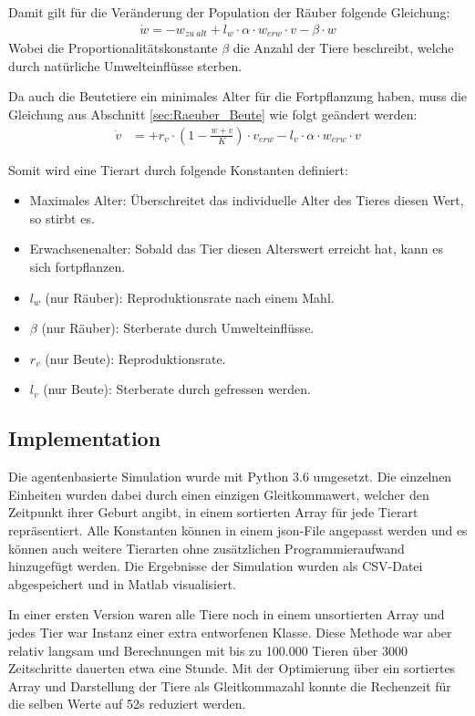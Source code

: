 \documentclass[a4paper,twoside]{article}
\begin{document}
	Damit gilt für die Veränderung der Population der Räuber folgende Gleichung:
	\begin{align*}
		\dot{w} = -w_{zu~alt} + l_w \cdot \alpha \cdot w_{erw} \cdot v - \beta \cdot w
	\end{align*}
	Wobei die Proportionalitätskonstante \(\beta\) die Anzahl der Tiere beschreibt, welche durch natürliche Umwelteinflüsse sterben.

	Da auch die Beutetiere ein minimales Alter für die Fortpflanzung haben, muss die Gleichung aus Abschnitt \ref{sec:Raeuber_Beute} wie folgt geändert werden:
	\begin{align*}
		\dot{v} &= +r_v \cdot \left(1 - \frac{w+v}{K} \right) \cdot v_{erw} - l_v \cdot \alpha \cdot w_{erw} \cdot v
	\end{align*}
	
		Somit wird eine Tierart durch folgende Konstanten definiert:
	\begin{itemize}
	\item Maximales Alter: Überschreitet das individuelle Alter des Tieres diesen Wert, so stirbt es.
	\item Erwachsenenalter: Sobald das Tier diesen Alterswert erreicht hat, kann es sich fortpflanzen.
	\item \(l_w\) (nur Räuber): Reproduktionsrate nach einem Mahl.
	\item \(\beta\) (nur Räuber): Sterberate durch Umwelteinflüsse.
	\item \(r_v\) (nur Beute): Reproduktionsrate.
	\item \(l_v\) (nur Beute): Sterberate durch gefressen werden.
	\end{itemize}
	\subsection{Implementation}
	Die agentenbasierte Simulation wurde mit Python 3.6 umgesetzt. Die einzelnen Einheiten wurden dabei durch einen einzigen Gleitkommawert, welcher den Zeitpunkt ihrer Geburt angibt, in einem sortierten Array für jede Tierart repräsentiert. Alle Konstanten können in einem json-File angepasst werden und es können auch weitere Tierarten ohne zusätzlichen Programmieraufwand hinzugefügt werden. Die Ergebnisse der Simulation wurden als CSV-Datei abgespeichert und in Matlab visualisiert.
	
	In einer ersten Version waren alle Tiere noch in einem unsortierten Array und jedes Tier war Instanz einer extra entworfenen Klasse. Diese Methode war aber relativ langsam und  Berechnungen mit bis zu 100.000 Tieren über 3000 Zeitschritte dauerten etwa eine Stunde. Mit der Optimierung über ein sortiertes Array und Darstellung der Tiere als Gleitkommazahl konnte die Rechenzeit für die selben Werte auf 52s reduziert werden.
	
\end{document}
